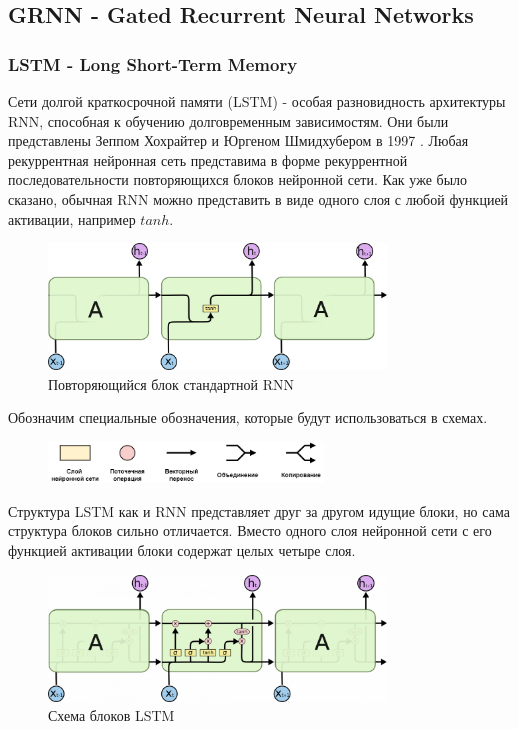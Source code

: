 	\subsection{GRNN - Gated Recurrent Neural Networks}
	\subsubsection{LSTM - Long Short-Term Memory}
	
	Сети долгой краткосрочной памяти (LSTM) - особая разновидность архитектуры RNN, способная к обучению долговременным зависимостям. Они были представлены Зеппом Хохрайтер и Юргеном Шмидхубером в 1997 \cite{2}. Любая рекуррентная нейронная сеть представима в форме рекуррентной последовательности повторяющихся блоков нейронной сети. Как уже было сказано, обычная RNN можно представить в виде одного слоя с любой функцией активации, например $tanh$. 
	
	\begin{figure}[ht!]
		\centering
		\captionsetup{justification=centering}
		\includegraphics[width=0.8\textwidth]{img/RNN Chain.png}
		\caption{Повторяющийся блок стандартной RNN}
	\end{figure}
	
	Обозначим специальные обозначения, которые будут использоваться в схемах.
	\begin{figure}[ht!]
		\centering
		\captionsetup{justification=centering}
		\includegraphics[width=0.65\textwidth]{img/Обозначения.png}
	\end{figure}
	
	Структура LSTM как и RNN представляет друг за другом идущие блоки, но сама структура блоков сильно отличается. Вместо одного слоя нейронной сети с его функцией активации блоки содержат целых четыре слоя.
	
	\begin{figure}[ht!]
		\centering
		\captionsetup{justification=centering}
		\includegraphics[width=0.8\textwidth]{img/LSTM Chain.png}
		\caption{Схема блоков LSTM}
	\end{figure}
	
